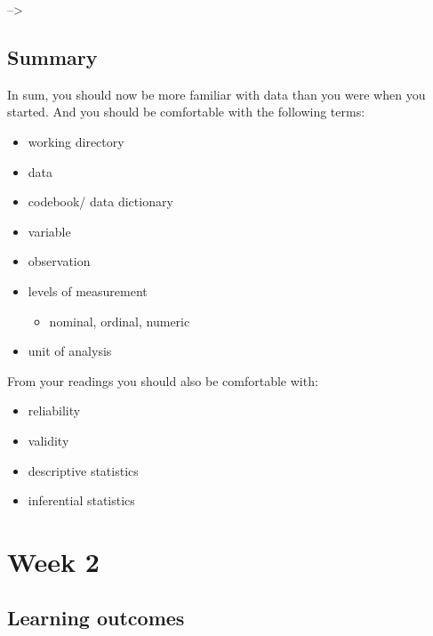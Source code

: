 \documentclass[]{book}
\providecommand{\tightlist}{%
  \setlength{\itemsep}{0pt}\setlength{\parskip}{0pt}}
\theoremstyle{definition}
\theoremstyle{definition}
\theoremstyle{definition}
\theoremstyle{remark}
\begin{document}
--\textgreater{}

\hypertarget{summary}{%
\section{Summary}\label{summary}}

In sum, you should now be more familiar with data than you were when you
started. And you should be comfortable with the following terms:

\begin{itemize}
\tightlist
\item
  working directory
\item
  data
\item
  codebook/ data dictionary
\item
  variable
\item
  observation
\item
  levels of measurement

  \begin{itemize}
  \tightlist
  \item
    nominal, ordinal, numeric
  \end{itemize}
\item
  unit of analysis
\end{itemize}

From your readings you should also be comfortable with:

\begin{itemize}
\tightlist
\item
  reliability
\item
  validity
\item
  descriptive statistics
\item
  inferential statistics
\end{itemize}

\hypertarget{week2}{%
\chapter{Week 2}\label{week2}}

\hypertarget{learning-outcomes-1}{%
\section{Learning outcomes}\label{learning-outcomes-1}}
\end{document}
